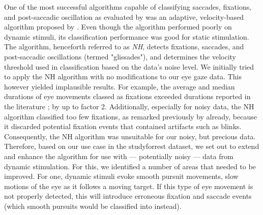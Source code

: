 One of the most successful algorithms capable of classifying saccades, fixations, and post-saccadic oscillation as evaluated by \citet{Andersson2017} was an adaptive, velocity-based algorithm proposed by \citet{Nystrom2010AnData}. Even though the algorithm performed poorly on dynamic stimuli, its classification performance was good for static stimulation. The algorithm, henceforth referred to as \textit{NH}, detects fixations, saccades, and post-saccadic oscillations (termed "glissades"), and determines the velocity threshold used in classification based on the data's noise level. We initially tried to apply the NH algorithm with no modifications to our eye gaze data. This however yielded implausible results. For example, the average and median durations of eye movements classed as fixations exceeded durations reported in the literature \citep{holmqvist2011eye}; \citep{dorr2010variability} by up to factor 2. Additionally, especially for noisy data, the NH algorithm classified too few fixations, as remarked previously by \citet{Friedman2018} already, because it discarded potential fixation events that contained artifacts such as blinks. Consequently, the NH algorithm was unsuitable for our noisy, but precious data. Therefore, based on our use case in the studyforrest dataset, we set out to extend and enhance the algorithm for use with --- potentially noisy --- data from dynamic stimulation. For this, we identified a number of areas that needed to be improved. For one, dynamic stimuli evoke smooth pursuit movements, slow motions of the eye as it follows a moving target. If this type of eye movement is not properly detected, this will introduce erroneous fixation and saccade events (which smooth pursuits would be classified into instead). 


